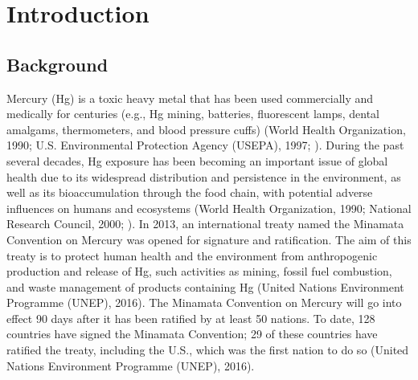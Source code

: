 \chapter{Introduction}

\section{Background}

Mercury (Hg) is a toxic heavy metal that has been used commercially and medically for centuries (e.g., Hg mining, batteries, fluorescent lamps, dental amalgams, thermometers, and blood pressure cuffs) (World Health Organization, 1990; U.S. Environmental Protection Agency (USEPA), 1997; \cite{clarkson2006toxicology}). During the past several decades, Hg exposure has been becoming an important issue of global health due to its widespread distribution and persistence in the environment, as well as its bioaccumulation through the food chain, with potential adverse influences on humans and ecosystems (World Health Organization, 1990; National Research Council, 2000; \cite{clarkson2003toxicology}). In 2013, an international treaty named the Minamata Convention on Mercury was opened for signature and ratification. The aim of this treaty is to protect human health and the environment from anthropogenic production and release of Hg, such activities as mining, fossil fuel combustion, and waste management of products containing Hg (United Nations Environment Programme (UNEP), 2016). The Minamata Convention on Mercury will go into effect 90 days after it has been ratified by at least 50 nations. To date, 128 countries have signed the Minamata Convention; 29 of these countries have ratified the treaty, including the U.S., which was the first nation to do so (United Nations Environment Programme (UNEP), 2016).


